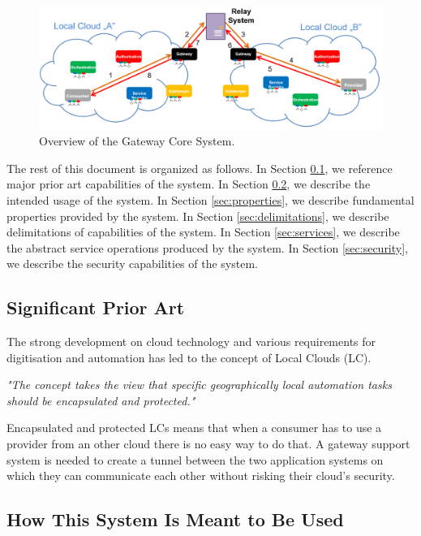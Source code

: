 \documentclass[a4paper]{arrowhead}
\begin{document}
\begin{figure}[h!]
  \centering
  \includegraphics[width=16cm]{figures/gateway_overview.png}
  \caption{
    Overview of the Gateway Core System.
  }
  \label{fig:gateway_overview}
\end{figure}

The rest of this document is organized as follows.
In Section \ref{sec:prior_art}, we reference major prior art capabilities
of the system.
In Section \ref{sec:use}, we describe the intended usage of the system.
In Section \ref{sec:properties}, we describe fundamental properties
provided by the system.
In Section \ref{sec:delimitations}, we describe delimitations of capabilities
of the system.
In Section \ref{sec:services}, we describe the abstract service
operations produced by the system.
In Section \ref{sec:security}, we describe the security capabilities
of the system.

\subsection{Significant Prior Art}
\label{sec:prior_art}

The strong development on cloud technology and various requirements for digitisation and automation has led to the concept of Local Clouds (LC).

\textit{"The concept takes the view that specific geographically local automation tasks should be encapsulated and protected."} \cite{jerker2017localclouds}

Encapsulated and protected LCs means that when a consumer has to use a provider from an other cloud there is no easy way to do that. A gateway support system is needed to create a tunnel between the two application systems on which they can communicate each other without risking their cloud's security.  

\subsection{How This System Is Meant to Be Used}
\label{sec:use}
\end{document}
